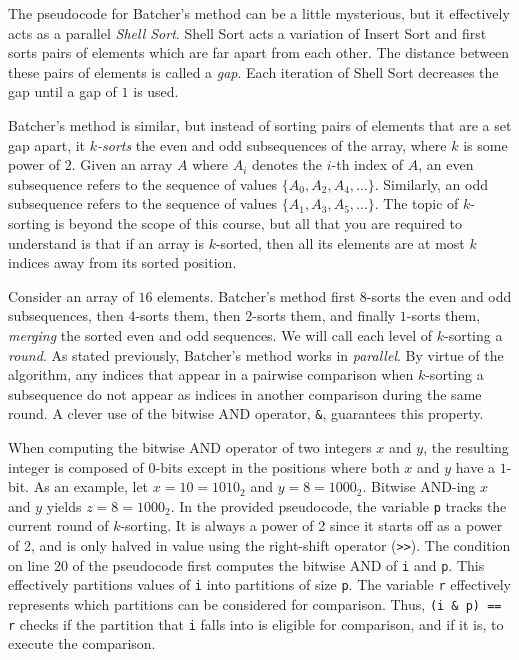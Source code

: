 The pseudocode for Batcher's method can be a little mysterious, but it
effectively acts as a parallel \emph{Shell Sort}. Shell Sort acts a variation of
Insert Sort and first sorts pairs of elements which are far apart from each
other. The distance between these pairs of elements is called a \emph{gap}. Each
iteration of Shell Sort decreases the gap until a gap of $1$ is used.

Batcher's method is similar, but instead of sorting pairs of elements that are a
set gap apart, it \emph{$k$-sorts} the even and odd subsequences of the array,
where $k$ is some power of $2$. Given an array $A$ where $A_i$ denotes the
$i$-th index of $A$, an even subsequence refers to the sequence of values
$\{A_0, A_2, A_4, \dots \}$. Similarly, an odd subsequence refers to the sequence
of values $\{A_1, A_3, A_5, \dots \}$. The topic of $k$-sorting is beyond the
scope of this course, but all that you are required to understand is that if an
array is $k$-sorted, then all its elements are at most $k$ indices away from its
sorted position.

Consider an array of $16$ elements. Batcher's method first $8$-sorts the even
and odd subsequences, then $4$-sorts them, then $2$-sorts them, and finally
$1$-sorts them, \emph{merging} the sorted even and odd sequences. We will call
each level of $k$-sorting a \emph{round}. As stated previously, Batcher's method
works in \emph{parallel}. By virtue of the algorithm, any indices that appear in
a pairwise comparison when $k$-sorting a subsequence do not appear as indices in
another comparison during the same round. A clever use of the bitwise AND
operator, \texttt{\&}, guarantees this property.

When computing the bitwise AND operator of two integers $x$ and $y$, the
resulting integer is composed of $0$-bits except in the positions where both $x$
and $y$ have a $1$-bit. As an example, let $x = 10 = 1010_2$ and $y = 8 =
1000_2$. Bitwise AND-ing $x$ and $y$ yields $z = 8 = 1000_2$. In the provided
pseudocode, the variable \texttt{p} tracks the current round of $k$-sorting. It
is always a power of 2 since it starts off as a power of 2, and is only halved
in value using the right-shift operator (\verb|>>|). The condition on line 20 of
the pseudocode first computes the bitwise AND of \texttt{i} and \texttt{p}. This
effectively partitions values of \texttt{i} into partitions of size \texttt{p}.
The variable \texttt{r} effectively represents which partitions can be
considered for comparison. Thus, \texttt{(i \& p) == r} checks if the partition
that \texttt{i} falls into is eligible for comparison, and if it is, to execute
the comparison.

